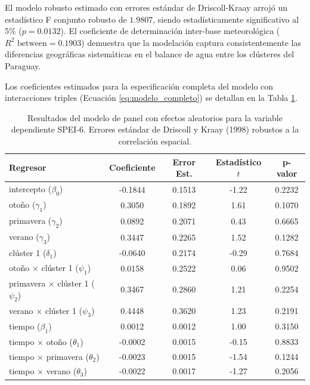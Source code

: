 \documentclass[11pt,a4paper]{article}
\begin{document}
El modelo robusto estimado con errores estándar de Driscoll-Kraay arrojó un estadístico F conjunto robusto de $1.9807$, siendo estadísticamente significativo al 5\% ($p = 0.0132$). El coeficiente de determinación inter-base meteorológica ($R^2 \text{ between} = 0.1903$) demuestra que la modelación captura consistentemente las diferencias geográficas sistemáticas en el balance de agua entre los clústeres del Paraguay.

Los coeficientes estimados para la especificación completa del modelo con interacciones triples (Ecuación \ref{eq:modelo_completo}) se detallan en la Tabla \ref{tab:coeficientes_completos}.

\begin{table}[ht!]
\centering
\begin{threeparttable}
\caption{Resultados del modelo de panel con efectos aleatorios para la variable dependiente SPEI-6. Errores estándar de Driscoll y Kraay (1998) robustos a la correlación espacial.}
\label{tab:coeficientes_completos}
\vspace{-0.4cm}
\singlespacing
\footnotesize
\begin{tabular}{l c c c c}
\hline\hline
\textbf{Regresor} & \textbf{Coeficiente} & \textbf{Error Est.} & \textbf{Estadístico $t$} & \textbf{p-valor} \\
\hline
intercepto ($\beta_0$) & -0.1844 & 0.1513 & -1.22 & 0.2232 \\
otoño ($\gamma_1$) & 0.3050 & 0.1892 & 1.61 & 0.1070 \\
primavera ($\gamma_2$) & 0.0892 & 0.2071 & 0.43 & 0.6665 \\
verano ($\gamma_3$) & 0.3447 & 0.2265 & 1.52 & 0.1282 \\
clúster 1 ($\delta_1$) & -0.0640 & 0.2174 & -0.29 & 0.7684 \\
otoño $\times$ clúster 1 ($\psi_1$) & 0.0158 & 0.2522 & 0.06 & 0.9502 \\
primavera $\times$ clúster 1 ($\psi_2$) & 0.3467 & 0.2860 & 1.21 & 0.2254 \\
verano $\times$ clúster 1 ($\psi_3$) & 0.4448 & 0.3620 & 1.23 & 0.2191 \\
tiempo ($\beta_1$) & 0.0012 & 0.0012 & 1.00 & 0.3150 \\
tiempo $\times$ otoño ($\theta_1$) & -0.0002 & 0.0015 & -0.15 & 0.8833 \\
tiempo $\times$ primavera ($\theta_2$) & -0.0023 & 0.0015 & -1.54 & 0.1244 \\
tiempo $\times$ verano ($\theta_3$) & -0.0022 & 0.0017 & -1.27 & 0.2056 \\

\end{tabular}
\end{threeparttable}
\end{table}
\end{document}
